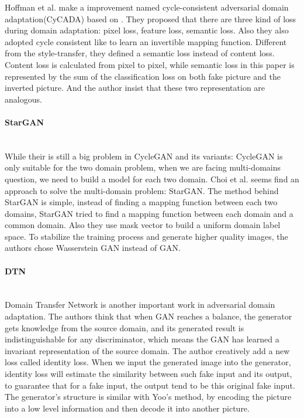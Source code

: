 \documentclass{kththesis}
\begin{document}
\noindent Hoffman et al. \cite{hoffman2017cycada} make a improvement named cycle-consistent adversarial domain adaptation(CyCADA) based on \cite{zhu2017unpaired}. They proposed that there are three kind of loss during domain adaptation: pixel loss, feature loss, semantic loss. Also they also adopted cycle consistent like\cite{zhu2017unpaired} to learn an invertible mapping function. Different from the style-transfer\cite{gatys2016image,johnson2016perceptual}, they defined a semantic loss instead of content loss. Content loss is calculated from pixel to pixel, while semantic loss in this paper is represented by the sum of the classification loss on both fake picture and the inverted picture. And the author insist that these two representation are analogous. 

\paragraph{StarGAN}~{}\\

\noindent While their is still a big problem in CycleGAN and its variants: CycleGAN is only suitable for the two domain problem, when we are facing multi-domains question, we need to build a model for each two domain. Choi et al.\cite{choi2017stargan} seems find an approach to solve the multi-domain problem: StarGAN. The method behind StarGAN is simple, instead of finding a mapping function between each two domains, StarGAN tried to find a mapping function between each domain and a common domain. Also they use mask vector to build a uniform domain label space. To stabilize the training process and generate higher quality images, the authors chose Wasserstein GAN\cite{arjovsky2017wasserstein} instead of GAN. 

\paragraph{DTN}~{}\\

\noindent Domain Transfer Network\cite{taigman2016unsupervised} is another important work in adversarial domain adaptation. The authors think that when GAN reaches a balance, the generator gets knowledge from the source domain, and its generated result is indistinguishable for any discriminator, which means the GAN has learned a invariant representation of the source domain. The author creatively add a new loss called identity loss. When we input the generated image into the generator, identity loss will estimate the similarity between such fake input and its output, to guarantee that for a fake input, the output tend to be this original fake input. The generator's structure is similar with Yoo's\cite{yoo2016pixel} method, by encoding the picture into a low level information and then decode it into another picture. 
\end{document}

